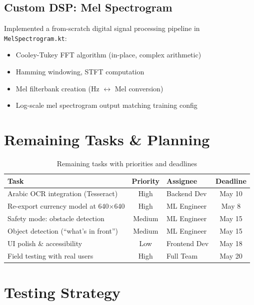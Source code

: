 \documentclass[12pt,a4paper]{article}
\begin{document}
\subsection{Custom DSP: Mel Spectrogram}
Implemented a from-scratch digital signal processing pipeline in \texttt{MelSpectrogram.kt}:
\begin{itemize}
  \item Cooley-Tukey FFT algorithm (in-place, complex arithmetic)
  \item Hamming windowing, STFT computation
  \item Mel filterbank creation (Hz $\leftrightarrow$ Mel conversion)
  \item Log-scale mel spectrogram output matching training config
\end{itemize}

\section{Remaining Tasks \& Planning}

\begin{table}[h]
\centering
\begin{tabular}{p{5cm}cp{3cm}c}
\toprule
\textbf{Task} & \textbf{Priority} & \textbf{Assignee} & \textbf{Deadline} \\
\midrule
Arabic OCR integration (Tesseract) & High & Backend Dev & May 10 \\
Re-export currency model at 640$\times$640 & High & ML Engineer & May 8 \\
Safety mode: obstacle detection & Medium & ML Engineer & May 15 \\
Object detection (``what's in front'') & Medium & ML Engineer & May 15 \\
UI polish \& accessibility & Low & Frontend Dev & May 18 \\
Field testing with real users & High & Full Team & May 20 \\
\bottomrule
\end{tabular}
\caption{Remaining tasks with priorities and deadlines}
\end{table}

\section{Testing Strategy}
\end{document}
